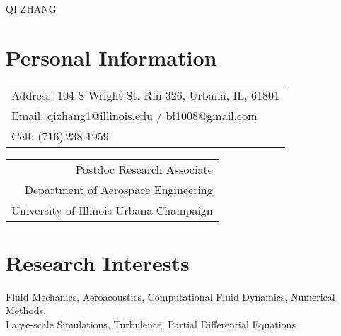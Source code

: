 \documentclass[11pt,letter]{article}
\begin{document}
\renewcommand{\headrulewidth}{0pt}
\renewcommand{\footrulewidth}{0pt}
\setcounter{page}{1}
\pagestyle{fancyplain}
\fancyhf{}
%
\newcommand{\QZ}{\textbf{Q. Zhang}}
\newcommand{\DJB}{D. Bodony}
\newcommand{\UIUC}{University of Illinois at Urbana-Champaign}
%
\begin{center}
{\LARGE\textsc{QI ZHANG}}
\end{center}


\section*{Personal Information}
  \begin{minipage}{3.65in}
    \begin{tabular}{l}
  Address: 104 S Wright St.  Rm 326, Urbana, IL, 61801 \\
  Email: qizhang1@illinois.edu / bl1008@gmail.com\\
  Cell: (716)\,238-1959
    \end{tabular}
  \end{minipage}
  \begin{minipage}{3.65in}
    \begin{tabular}{r}
  Postdoc Research Associate\\
  Department of Aerospace Engineering\\
  University of Illinois Urbana-Champaign\\
    \end{tabular}
  \end{minipage}
  

\section*{Research Interests}
\begin{adjustwidth}{2em}{0pt}
Fluid Mechanics, Aeroacoustics, Computational Fluid Dynamics, Numerical Methods, \\ Large-scale Simulations, Turbulence, Partial Differential Equations
\end{adjustwidth}
\end{document}
